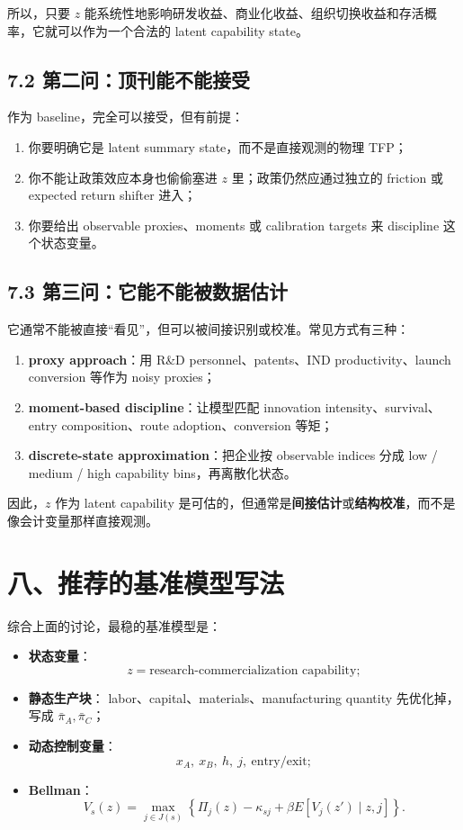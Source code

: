 \documentclass[12pt]{ctexart}
\begin{document}
所以，只要 \(z\) 能系统性地影响研发收益、商业化收益、组织切换收益和存活概率，它就可以作为一个合法的 latent capability state。

\subsection{7.2 第二问：顶刊能不能接受}

作为 baseline，完全可以接受，但有前提：

\begin{enumerate}[leftmargin=2em]
    \item 你要明确它是 latent summary state，而不是直接观测的物理 TFP；
    \item 你不能让政策效应本身也偷偷塞进 \(z\) 里；政策仍然应通过独立的 friction 或 expected return shifter 进入；
    \item 你要给出 observable proxies、moments 或 calibration targets 来 discipline 这个状态变量。
\end{enumerate}

\subsection{7.3 第三问：它能不能被数据估计}

它通常不能被直接“看见”，但可以被间接识别或校准。常见方式有三种：

\begin{enumerate}[leftmargin=2em]
    \item \textbf{proxy approach}：用 R\&D personnel、patents、IND productivity、launch conversion 等作为 noisy proxies；
    \item \textbf{moment-based discipline}：让模型匹配 innovation intensity、survival、entry composition、route adoption、conversion 等矩；
    \item \textbf{discrete-state approximation}：把企业按 observable indices 分成 low / medium / high capability bins，再离散化状态。
\end{enumerate}

因此，\(z\) 作为 latent capability 是可估的，但通常是\textbf{间接估计}或\textbf{结构校准}，而不是像会计变量那样直接观测。

\section{八、推荐的基准模型写法}

综合上面的讨论，最稳的基准模型是：

\begin{itemize}[leftmargin=2em]
    \item \textbf{状态变量}：
    \[
    z=\text{research-commercialization capability};
    \]
    \item \textbf{静态生产块}：
    labor、capital、materials、manufacturing quantity 先优化掉，写成 \(\bar{\pi}_A,\bar{\pi}_C\)；
    \item \textbf{动态控制变量}：
    \[
    x_A,\ x_B,\ h,\ j,\ \text{entry/exit};
    \]
    \item \textbf{Bellman}：
    \[
    V_s(z)=\max_{j\in J(s)}
    \left\{
    \Pi_j(z)-\kappa_{sj}+\beta E[V_j(z')\mid z,j]
    \right\}.
    \]
\end{itemize}
\end{document}
